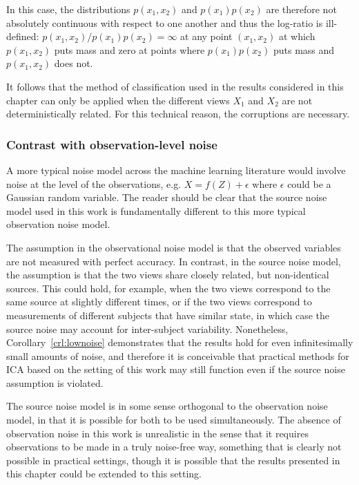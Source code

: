 In this case, the distributions $p(x_1, x_2)$ and $p(x_1)p(x_2)$ are therefore not absolutely continuous with respect to one another and thus the log-ratio is ill-defined: $p(x_1, x_2)/p(x_1)p(x_2) = \infty$ at any point $(x_1,x_2)$ at which $p(x_1, x_2)$ puts mass and zero at points where $p(x_1)p(x_2)$ puts mass and $p(x_1,x_2)$ does not.

It follows that the method of classification used in the results considered in this chapter can only be applied when the different views $X_1$ and $X_2$ are not deterministically related.
For this technical reason, the corruptions are necessary.


\subsubsection{Contrast with observation-level noise}

A more typical noise model across the machine learning literature would involve noise at the level of the observations, e.g. $X = f(Z) + \epsilon$ where $\epsilon$ could be a Gaussian random variable. 
The reader should be clear that the source noise model used in this work is fundamentally different to this more typical observation noise model.

The assumption in the observational noise model is that the observed variables are not measured with perfect accuracy.
In contrast, in the source noise model, the assumption is that the two views share closely related, but non-identical sources.
This could hold, for example, when the two views correspond to the same source at slightly different times, or if the two views correspond to measurements of different subjects that have similar state, in which case the source noise may account for inter-subject variability.
Nonetheless, Corollary~\ref{crl:lownoise} demonstrates that the results hold for even infinitesimally small amounts of noise, and therefore it is conceivable that practical methods for ICA based on the setting of this work may still function even if the source noise assumption is violated.

The source noise model is in some sense orthogonal to the observation noise model, in that it is possible for both to be used simultaneously.
The absence of observation noise in this work is unrealistic in the sense that it requires observations to be made in a truly noise-free way, something that is clearly not possible in practical settings, though it is possible that the results presented in this chapter could be extended to this setting.




